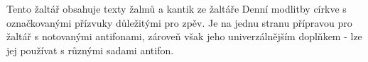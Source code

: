 \documentclass[a4paper]{article}
\begin{document}


\titulniStrankaSvazkuAntifonare

Tento žaltář obsahuje texty žalmů a kantik ze žaltáře
Denní modlitby církve s označkovanými přízvuky důležitými
pro zpěv.
Je na jednu stranu přípravou pro žaltář s notovanými antifonami,
zároveň však jeho univerzálnějším doplňkem - lze jej používat
s různými sadami antifon.

% 



\nesporyI





\ranniChvaly




  
\clearpage
\tirazSvazkuAntifonare
\end{document}
